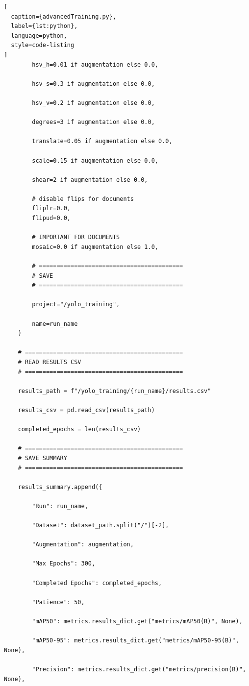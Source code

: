 \begin{lstlisting}[
  caption={advancedTraining.py},
  label={lst:python},
  language=python,
  style=code-listing
]
        hsv_h=0.01 if augmentation else 0.0,

        hsv_s=0.3 if augmentation else 0.0,

        hsv_v=0.2 if augmentation else 0.0,

        degrees=3 if augmentation else 0.0,

        translate=0.05 if augmentation else 0.0,

        scale=0.15 if augmentation else 0.0,

        shear=2 if augmentation else 0.0,

        # disable flips for documents
        fliplr=0.0,
        flipud=0.0,

        # IMPORTANT FOR DOCUMENTS
        mosaic=0.0 if augmentation else 1.0,

        # =========================================
        # SAVE
        # =========================================

        project="/yolo_training",

        name=run_name
    )

    # =============================================
    # READ RESULTS CSV
    # =============================================

    results_path = f"/yolo_training/{run_name}/results.csv"

    results_csv = pd.read_csv(results_path)

    completed_epochs = len(results_csv)

    # =============================================
    # SAVE SUMMARY
    # =============================================

    results_summary.append({

        "Run": run_name,

        "Dataset": dataset_path.split("/")[-2],

        "Augmentation": augmentation,

        "Max Epochs": 300,

        "Completed Epochs": completed_epochs,

        "Patience": 50,

        "mAP50": metrics.results_dict.get("metrics/mAP50(B)", None),

        "mAP50-95": metrics.results_dict.get("metrics/mAP50-95(B)", None),

        "Precision": metrics.results_dict.get("metrics/precision(B)", None),


\end{lstlisting}
